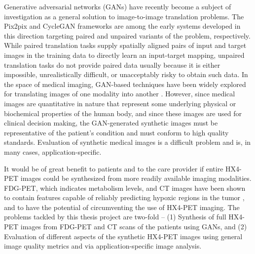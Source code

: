 Generative adversarial networks (GANs) have recently become a subject of investigation as a general solution to image-to-image translation problems. The Pix2pix and CycleGAN frameworks \cite{isola2017image, zhu2017unpaired} are among the early systems developed in this direction targeting paired and unpaired variants of the problem, respectively. While paired translation tasks supply spatially aligned pairs of input and target images in the training data to directly learn an input-target mapping, unpaired translation tasks do not provide paired data usually because it is either impossible, unrealistically difficult, or unacceptably risky to obtain such data. In the space of medical imaging, GAN-based techniques have been widely explored for translating images of one modality into another \cite{yi2019generative}. However, since medical images are quantitative in nature that represent some underlying physical or biochemical properties of the human body, and since these images are used for clinical decision making, the GAN-generated synthetic images must be representative of the patient's condition and must conform to high quality standards. Evaluation of synthetic medical images is a difficult problem and is, in many cases, application-specific. 

It would be of great benefit to patients and to the care provider if entire HX4-PET images could be synthesized from more readily available imaging modalities. FDG-PET, which indicates metabolism levels, and CT images have been shown to contain features capable of reliably predicting hypoxic regions in the tumor \cite{even2017predicting, sanduleanu2020non}, and to have the potential of circumventing the use of HX4-PET imaging. The problems tackled by this thesis project are two-fold -- (1) Synthesis of full HX4-PET images from FDG-PET and CT scans of the patients using GANs, and (2) Evaluation of different aspects of the synthetic HX4-PET images using general image quality metrics and via application-specific image analysis.



